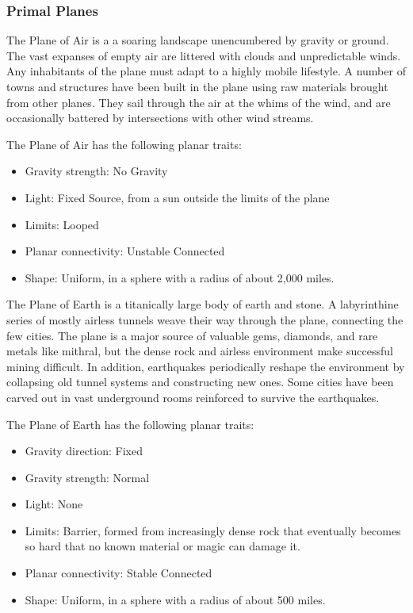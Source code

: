         \subsubsection{Primal Planes}

            The Plane of Air is a a soaring landscape unencumbered by gravity or ground.
            The vast expanses of empty air are littered with clouds and unpredictable winds.
            Any inhabitants of the plane must adapt to a highly mobile lifestyle.
            A number of towns and structures have been built in the plane using raw materials brought from other planes.
            They sail through the air at the whims of the wind, and are occasionally battered by intersections with other wind streams.

            The Plane of Air has the following planar traits:
            \begin{itemize}
                \item Gravity strength: No Gravity
                \item Light: Fixed Source, from a sun outside the limits of the plane
                \item Limits: Looped
                \item Planar connectivity: Unstable Connected
                \item Shape: Uniform, in a sphere with a radius of about 2,000 miles.
            \end{itemize}

            The Plane of Earth is a titanically large body of earth and stone.
            A labyrinthine series of mostly airless tunnels weave their way through the plane, connecting the few cities.
            The plane is a major source of valuable gems, diamonds, and rare metals like mithral, but the dense rock and airless environment make successful mining difficult.
            In addition, earthquakes periodically reshape the environment by collapsing old tunnel systems and constructing new ones.
            Some cities have been carved out in vast underground rooms reinforced to survive the earthquakes.

            The Plane of Earth has the following planar traits:
            \begin{itemize}
                \item Gravity direction: Fixed
                \item Gravity strength: Normal
                \item Light: None
                \item Limits: Barrier, formed from increasingly dense rock that eventually becomes so hard that no known material or magic can damage it.
                \item Planar connectivity: Stable Connected
                \item Shape: Uniform, in a sphere with a radius of about 500 miles.
            \end{itemize}

